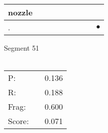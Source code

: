 \documentclass[landscape]{article}
\newcommand{\ssp}{\hspace{2pt}}
\newcommand{\mex}{\cellcolor{g}$\bullet$}
\begin{document}
\begin{tabular}{|l|p{10pt}|p{10pt}|p{10pt}|p{10pt}|p{10pt}|p{10pt}|p{10pt}|p{10pt}|}
\hline
\ssp nozzle \ssp&\hspace{2pt}&\hspace{2pt}&\hspace{2pt}&\hspace{2pt}&\hspace{2pt}&\hspace{2pt}&\hspace{2pt}&\hspace{2pt}\\
\hline
\ssp \cellcolor{ref7}. \ssp&\hspace{2pt}&\hspace{2pt}&\hspace{2pt}&\hspace{2pt}&\hspace{2pt}&\hspace{2pt}&\hspace{2pt}&\hspace{2pt}\mex\\
\hline
\end{tabular}

\vspace{6pt}
\noindent Segment 51\\\\
\noindent\begin{tabular}{lm{12pt}r}
\hline
P:&&0.136\\
R:&&0.188\\
Frag:&&0.600\\
Score:&&0.071\\
\end{tabular}

\newpage
\end{document}
